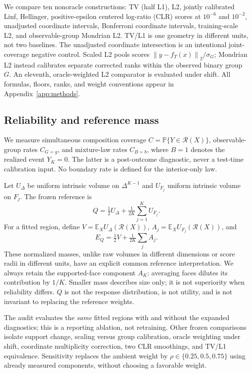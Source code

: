 \documentclass{article}
\theoremstyle{plain}
\newcommand{\simp}{\Delta^{K-1}}
\newcommand{\E}{\mathbb{E}}
\newcommand{\Prob}{\mathbb{P}}
\newcommand{\R}{\mathcal{R}}
\newcommand{\Udel}{U_{\Delta}}
\newcommand{\norm}[1]{\left\lVert #1\right\rVert}
\begin{document}
We compare ten nonoracle constructions: TV (half L1), L2, jointly calibrated Linf, Hellinger, positive-epsilon centered log-ratio (CLR) scores at $10^{-6}$ and $10^{-2}$, unadjusted coordinate intervals, Bonferroni coordinate intervals, training-scale L2, and observable-group Mondrian L2. TV/L1 is one geometry in different units, not two baselines. The unadjusted coordinate intersection is an intentional joint-coverage negative control. Scaled L2 pools scores $\norm{y-f_T(x)}_2/\sigma_G$; Mondrian L2 instead calibrates separate corrected ranks within the observed binary group $G$. An eleventh, oracle-weighted L2 comparator is evaluated under shift. All formulas, floors, ranks, and weight conventions appear in Appendix~\ref{app:methods}.

\subsection{Reliability and reference mass}
We measure simultaneous composition coverage $C=\Prob\{Y\in\R(X)\}$, observable-group rates $C_{G=g}$, and mixture-law rates $C_{B=b}$, where $B=1$ denotes the realized event $Y_K=0$. The latter is a post-outcome diagnostic, never a test-time calibration input. No boundary rate is defined for the interior-only law.

Let $\Udel$ be uniform intrinsic volume on $\simp$ and $U_{F_j}$ uniform intrinsic volume on $F_j$. The frozen reference is
\begin{equation}
 Q=\tfrac12\Udel+\tfrac1{2K}\sum_{j=1}^K U_{F_j}.
 \label{eq:Q}
\end{equation}
For a fitted region, define $V=\E_X\Udel(\R(X))$, $A_j=\E_XU_{F_j}(\R(X))$, and
\begin{equation}
 E_Q=\tfrac12 V+\tfrac1{2K}\sum_j A_j.
 \label{eq:mass}
\end{equation}
These normalized masses, unlike raw volumes in different dimensions or score radii in different units, have an explicit common reference interpretation. We always retain the supported-face component $A_K$: averaging faces dilutes its contribution by $1/K$. Smaller mass describes size only; it is not superiority when reliability differs. $Q$ is not the response distribution, is not utility, and is not invariant to replacing the reference weights.

The audit evaluates the \emph{same} fitted regions with and without the expanded diagnostics; this is a reporting ablation, not retraining. Other frozen comparisons isolate support change, scaling versus group calibration, oracle weighting under shift, coordinate multiplicity correction, two CLR smoothings, and TV/L1 equivalence. Sensitivity replaces the ambient weight by $\rho\in\{0.25,0.5,0.75\}$ using already measured components, without choosing a favorable weight.
\end{document}
